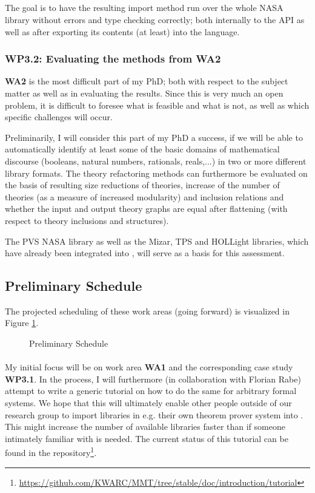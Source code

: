 \subparagraph{} The goal is to have the resulting import method run over the whole NASA library without errors and type checking correctly; both internally to the \mmt API as well as after exporting its contents (at least) into the \mmt language.

\subsubsection{\textbf{WP3.2}: Evaluating the methods from \textbf{WA2}}\label{sec:eval}

\textbf{WA2} is the most difficult part of my PhD; both with respect to the subject matter as well as in evaluating the results. Since this is very much an open problem, it is difficult to foresee what is feasible and what is not, as well as which specific challenges will occur.
	
	Preliminarily, I will consider this part of my PhD a success, if we will be able to automatically identify at least some of the basic domains of mathematical discourse (booleans, natural numbers, rationals, reals,...) in two or more different library formats. The theory refactoring methods can furthermore be evaluated on the basis of resulting size reductions of theories, increase of the number of theories (as a measure of increased modularity) and inclusion relations and whether the input and output theory graphs are equal after flattening (with respect to theory inclusions and \mmt structures). 
	
	The PVS NASA library as well as the Mizar, TPS and HOLLight libraries, which have already been integrated into \mmt, will serve as a basis for this assessment.
	
\subsection{Preliminary Schedule}

The projected scheduling of these work areas (going forward) is visualized in Figure \ref{fig:timeline}.

\begin{figure}[ht]\centering
	\caption{Preliminary Schedule}\label{fig:timeline}
\end{figure}

\paragraph{} My initial focus will be on work area \textbf{WA1} and the corresponding case study 
\textbf{WP3.1}. In the process, I will furthermore (in collaboration with Florian Rabe) attempt to write a generic tutorial on how to do the same for arbitrary formal systems. We hope that this will ultimately enable other people outside of our research group to import libraries in e.g. their own theorem prover system into \mmt. This might increase the number of available libraries faster than if someone intimately familiar with \mmt is needed.
The current status of this tutorial can be found in the \mmt repository\footnote{\url{https://github.com/KWARC/MMT/tree/stable/doc/introduction/tutorial}}.


